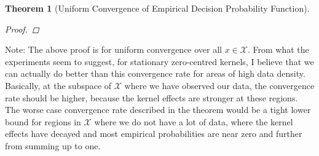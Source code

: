 \documentclass{article}
\newcommand{\note}[1]{{\color{orange} #1}}
\newtheorem{theorem}{Theorem}[section]
\begin{document}
\begin{theorem}[Uniform Convergence of Empirical Decision Probability Function]
\begin{proof}
%			
%			
			
		\end{proof}
	\end{theorem}
	
	\note{Note: The above proof is for uniform convergence over all $x \in \mathcal{X}$. From what the experiments seem to suggest, for stationary zero-centred kernels, I believe that we can actually do better than this convergence rate for areas of high data density. Basically, at the subspace of $\mathcal{X}$ where we have observed our data, the convergence rate should be higher, because the kernel effects are stronger at these regions. The worse case convergence rate described in the theorem would be a tight lower bound for regions in $\mathcal{X}$ where we do not have a lot of data, where the kernel effects have decayed and most empirical probabilities are near zero and further from summing up to one.}
	
\end{document}
